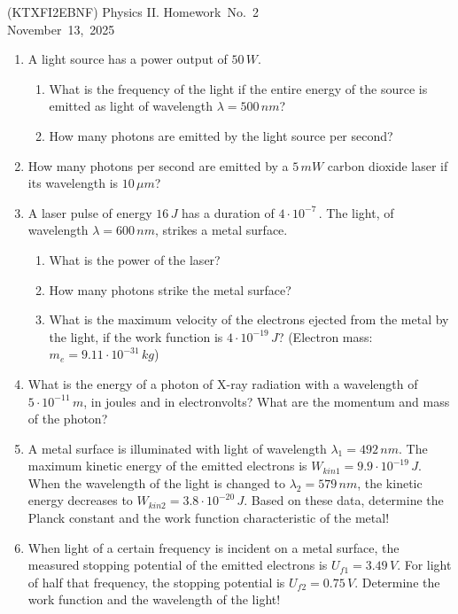 \documentclass[a4paper,12pt]{letter}
\begin{document}
\begin{center}
 (KTXFI2EBNF) Physics II.  Homework~No.~2\\ \smallskip
November~13,~2025
 \end{center}



\begin{enumerate}

\item A light source has a power output of $50\,W$.

\begin{enumerate}
    \item[a)] What is the frequency of the light if the entire energy of the source is emitted as light of wavelength $ \lambda = 500\,nm $?
    \item[b)] How many photons are emitted by the light source per second?
\end{enumerate}

\item How many photons per second are emitted by a $ 5\,mW $ carbon dioxide laser if its wavelength is $ 10\,\mu m$?

\item A laser pulse of energy $ 16 \,J$ has a duration of $ 4 \cdot 10^{-7} \,$.  The light, of wavelength $ \lambda = 600\,nm $, strikes a metal surface.

\begin{enumerate}
    \item What is the power of the laser?
    \item How many photons strike the metal surface?
    \item What is the maximum velocity of the electrons ejected from the metal by the light, if the work function is $ 4 \cdot 10^{-19} \,J$?     (Electron mass: $ m_{e} = 9.11 \cdot 10^{-31} \,kg$)
\end{enumerate}

\item What is the energy of a photon of X-ray radiation with a wavelength of $ 5\cdot10^{-11}\,m$,  in joules and in electronvolts?  What are the momentum and mass of the photon?

\item A metal surface is illuminated with light of wavelength $ \lambda_{1} = 492\,nm $.  The maximum kinetic energy of the emitted electrons is $ W_{kin1} = 9.9 \cdot 10^{-19} \,J$.  When the wavelength of the light is changed to $ \lambda_{2} = 579\,nm $, the kinetic energy decreases to $ W_{kin2} =3.8 \cdot 10^{-20} \,J$.  Based on these data, determine the Planck constant and the work function characteristic of the metal!

\item When light of a certain frequency is incident on a metal surface, the measured stopping potential of the emitted electrons is $ U_{f1} = 3.49\,V$.  For light of half that frequency, the stopping potential is $ U_{f2} = 0.75 \,V $.   Determine the work function and the wavelength of the light!
\end{enumerate}

\bigskip


\vfill
\end{document}
